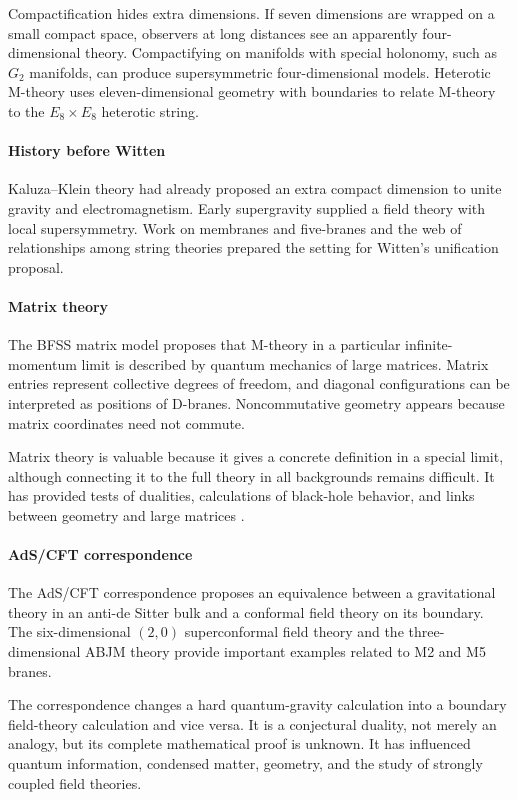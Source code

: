 Compactification hides extra dimensions. If seven dimensions are wrapped on a small compact space, observers at long distances see an apparently four-dimensional theory. Compactifying on manifolds with special holonomy, such as $G_2$ manifolds, can produce supersymmetric four-dimensional models. Heterotic M-theory uses eleven-dimensional geometry with boundaries to relate M-theory to the $E_8\times E_8$ heterotic string.

\paragraph{History before Witten}
Kaluza--Klein theory had already proposed an extra compact dimension to unite gravity and electromagnetism. Early supergravity supplied a field theory with local supersymmetry. Work on membranes and five-branes and the web of relationships among string theories prepared the setting for Witten's unification proposal.

\paragraph{Matrix theory}
The BFSS matrix model proposes that M-theory in a particular infinite-momentum limit is described by quantum mechanics of large matrices. Matrix entries represent collective degrees of freedom, and diagonal configurations can be interpreted as positions of D-branes. Noncommutative geometry appears because matrix coordinates need not commute.

Matrix theory is valuable because it gives a concrete definition in a special limit, although connecting it to the full theory in all backgrounds remains difficult. It has provided tests of dualities, calculations of black-hole behavior, and links between geometry and large matrices \cite{m_theory_ref3}.

\paragraph{AdS/CFT correspondence}
The AdS/CFT correspondence proposes an equivalence between a gravitational theory in an anti-de Sitter bulk and a conformal field theory on its boundary. The six-dimensional $(2,0)$ superconformal field theory and the three-dimensional ABJM theory provide important examples related to M2 and M5 branes.

The correspondence changes a hard quantum-gravity calculation into a boundary field-theory calculation and vice versa. It is a conjectural duality, not merely an analogy, but its complete mathematical proof is unknown. It has influenced quantum information, condensed matter, geometry, and the study of strongly coupled field theories.

